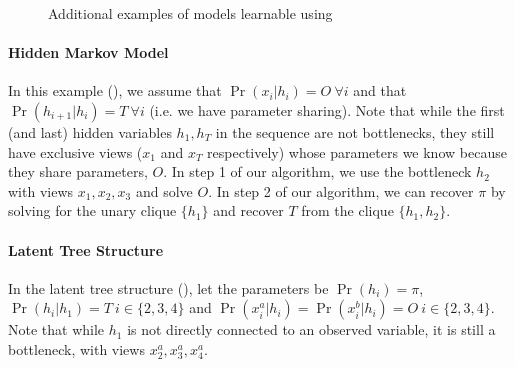 \begin{figure}
  \centering
  \caption{Additional examples of models learnable using \LearnMarginals}
  \label{fig:examples}
\end{figure}

\paragraph{Hidden Markov Model}

In this example (), we assume that
  $\Pr(x_i|h_i) = O  ~\forall i$  and that $\Pr(h_{i+1} | h_i)
  = T ~\forall i$ (i.e. we have parameter sharing).
Note that while the first (and last) hidden variables $h_1, h_T$ in the
  sequence are not bottlenecks, they still have exclusive views ($x_1$ and
  $x_T$ respectively) whose parameters we know because they share
  parameters, $O$.
In step 1 of our algorithm, we use the bottleneck $h_2$ with views $x_1,
  x_2, x_3$ and solve $O$.
In step 2 of our algorithm, we can recover $\pi$ by solving for the
  unary clique $\{h_1\}$ and recover $T$ from the clique $\{h_{1},
  h_{2}\}$.

\paragraph{Latent Tree Structure}

In the latent tree structure (), let the
  parameters be $\Pr(h_i) = \pi$, $\Pr(h_i | h_1) = T ~i \in \{2,3,4\}$
  and $\Pr(x^a_i | h_i) = \Pr(x^b_i | h_i) = O ~i \in \{2,3,4\}$.
Note that while $h_1$ is not directly connected to an observed variable,
  it is still a bottleneck, with views $x^a_2, x^a_3, x^a_4$.


